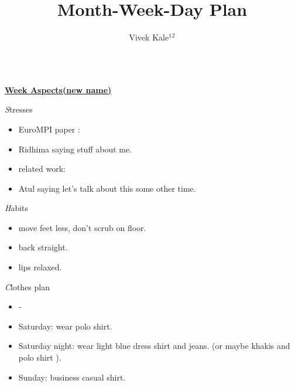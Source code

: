 \documentclass[serif,mathserif,final]{beamer}
\title{Month-Week-Day Plan}
\author{Vivek Kale$^1$$^2$}
\institute{$^1$ University of Illinois at Urbana-Champaign \quad}
\begin{document}
 
\begin{frame}{}
  
  \begin{columns}[t]
    
\begin{column}{0.30\linewidth} {\textbf{\underline{Week Aspects(new name)}}} 
  \begin{block}{\textit Stresses} 
    \begin{itemize}
    \item \tiny EuroMPI paper : 
      \small \item \tiny Ridhima saying stuff about me. 
    \item \tiny related work:   
    \item \tiny Atul saying let's talk about this some other time. 
    \end{itemize} 
  \end{block} 

  \begin{block}{\textit Habits } 
    \begin{itemize} 
      \tiny \item \tiny move feet less, don't scrub on floor. 
    \item \tiny back straight. 
    \item \tiny lips relaxed. 
    \end{itemize} 
  \end{block} 

  \begin{block}{\textit Clothes plan } 
    \begin{itemize} 
      \small \item \tiny - 
    \item \tiny Saturday: wear polo shirt. 
    \item \tiny Saturday night: wear light blue dress shirt and jeans. (or maybe khakis and polo shirt ). 
    \item \tiny Sunday: business casual shirt. 
    \end{itemize} 
  \end{block} 


\end{column}
\end{columns}
\end{frame}
\end{document}
